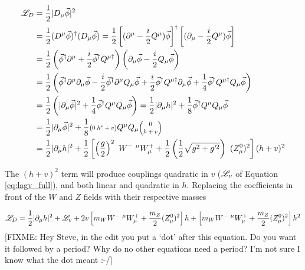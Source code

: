     \begin{equation} \begin{split}
        \Lag_D &= \frac{1}{2} |D_{\mu} \vec{\phi}|^2
            \\&= \frac{1}{2} (D^{\mu} \vec{\phi})^\dag (D_{\mu} \vec{\phi})
                = \frac{1}{2} \left[(\partial^{\mu} - \frac{i}{2}Q^{\mu}) \vec{\phi}\right]^\dag
                \left[(\partial_{\mu} - \frac{i}{2}Q^{\mu}) \vec{\phi}\right]
            \\&= \frac{1}{2} \left(\vec{\phi}^\dag \partial^{\mu} + \frac{i}{2} \vec{\phi}^\dag Q^{\mu \dag} \right)
                \left(\partial_{\mu}\vec{\phi} - \frac{i}{2}Q_{\mu}\vec{\phi} \right)
            \\&= \frac{1}{2} \left(
                \vec{\phi}^\dag \partial^{\mu} \partial_{\mu}\vec{\phi}
                - \frac{i}{2} \vec{\phi}^\dag \partial^{\mu} Q_{\mu}\vec{\phi}
                + \frac{i}{2} \vec{\phi}^\dag Q^{\mu \dag} \partial_{\mu}\vec{\phi}
                + \frac{1}{4} \vec{\phi}^\dag Q^{\mu \dag} Q_{\mu}\vec{\phi}
                \right)
            \\&= \frac{1}{2} \left(
                | \partial_{\mu}\vec{\phi} |^2
                + \frac{1}{4} \vec{\phi}^\dag Q^{\mu} Q_{\mu} \vec{\phi}
                \right)
                = \frac{1}{2} | \partial_{\mu}h |^2 + \frac{1}{8} \vec{\phi}^\dag Q^{\mu}Q_{\mu} \vec{\phi}
            \\&= \frac{1}{2} | \partial_{\mu}\vec{\phi} |^2 + \frac{1}{8} 
                    \minimatrix{0 & h^* + v} Q^{\mu}
                    Q_{\mu} \minimatrix{0 \\ h + v}
            \\&= \frac{1}{2} | \partial_{\mu}h |^2
                + \frac{1}{2} \left[ \left(\frac{g}{2}\right)^2\  W^{-\ \mu} W^+_{\mu}
                + \frac{1}{2} \left(\frac{1}{2}\sqrt{g^2 + g^{\prime 2}}\right)\ (Z^0_{\mu})^2 \right] (h+v)^2
    \end{split} \end{equation}

    The $(h+v)^2$ term will produce couplings quadratic in $v$ ($\mathscr{L}_v$ of Equation \ref{eq:lagv_full}), and both linear and quadratic in $h$.
    Replacing the coefficients in front of the $W$ and $Z$ fields with their respective masses

    \begin{equation} \begin{split}
        \mathscr{L}_D = \frac{1}{2} | \partial_{\mu}h |^2 + \mathscr{L}_v
            + 2v\left[ m_W W^{-\ \mu} W^+_{\mu} + \frac{m_Z}{2} (Z^0_{\mu})^2 \right] h
            + \left[ m_W W^{-\ \mu} W^+_{\mu} + \frac{m_Z}{2} (Z^0_{\mu})^2 \right] h^2
    \end{split} \end{equation}
    [FIXME: Hey Steve, in the edit you put a `dot' after this equation.
    Do you want it followed by a period? Why do no other equations need a period?
    I'm not sure I know what the dot meant :-/]

